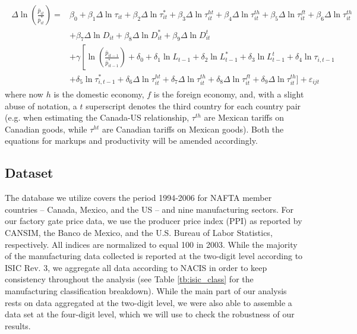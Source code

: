 \begin{align}
\begin{split}\label{eq:gw-estimation-prices-third-country}
\Delta \ln \left( \frac{\bar{p}_{it}}{\bar{p}_{it}^*} \right) = 
&\beta_0 + \beta_1 \Delta \ln \tau_{it} + \beta_2 \Delta \ln \tau_{it}^* + \beta_3 \Delta \ln \tau_{it}^{ht} 
+ \beta_4 \Delta \ln \tau_{it}^{th} + \beta_5 \Delta \ln \tau_{it}^{ft} + \beta_6 \Delta \ln \tau_{it}^{th} \\ 
&+ \beta_7 \Delta \ln D_{it} + \beta_8 \Delta \ln D_{it}^* + \beta_9 \Delta \ln D_{it}^t \\ 
&+ \gamma \left[ \ln \left( \frac{\bar{p}_{it-1}}{\bar{p}_{it-1}^*} \right) + \delta_0 + \delta_1 \ln L_{t-1} + \delta_2\ln L_{t-1}^* 
 + \delta_3 \ln L_{t-1}^t+ \delta_4 \ln \tau_{i,t-1} \right. \\ 
&+ \left. \delta_5 \ln  \tau_{i,t-1}^*  + \delta_6 \Delta \ln \tau_{it}^{ht} + \delta_7 \Delta \ln \tau_{it}^{th} 
 + \delta_8 \Delta \ln \tau_{it}^{ft} + \delta_9 \Delta \ln \tau_{it}^{th} \bigg] \right. + \varepsilon_{ijt} 
\end{split}\end{align}
where now $h$ is the domestic economy, $f$ is the foreign economy, and, with a slight abuse of notation, a $t$ superscript denotes the third country for each country pair (e.g. when estimating the Canada-US relationship, $\tau^{th}$ are Mexican tariffs on Canadian goods, while $\tau^{ht}$ are Canadian tariffs on Mexican goods). Both the equations for markups and productivity will be amended accordingly. 

\subsection{Dataset}

The database we utilize covers the period 1994-2006 for NAFTA member countries -- Canada, Mexico, and the US -- and nine manufacturing sectors. For our factory gate price data, we use the producer price index (PPI) as reported by CANSIM, the Banco de Mexico, and the U.S. Bureau of Labor Statistics, respectively. All indices are normalized to equal 100 in 2003. While the majority of the manufacturing data collected is reported at the two-digit level according to ISIC Rev. 3, we aggregate all data according to NACIS in order to keep consistency throughout the analysis (see Table \ref{tb:isic_class} for the manufacturing classification breakdown). While the main part of our analysis rests on data aggregated at the two-digit level, we were also able to assemble a data set at the four-digit level, which we will use to check the robustness of our results. 

